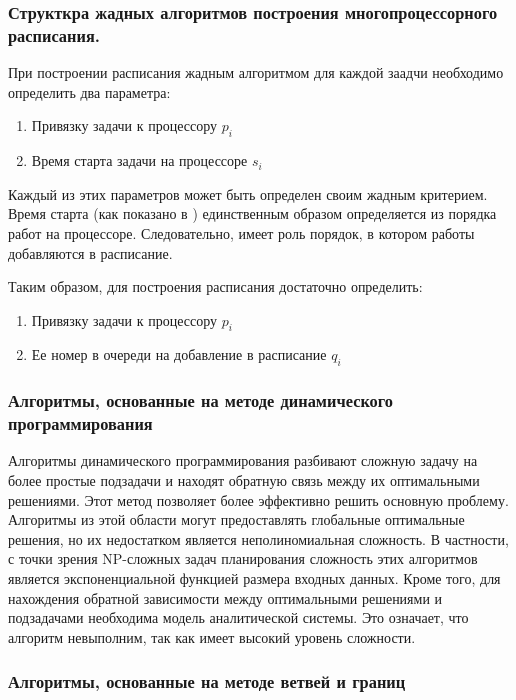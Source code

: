 \subsubsection{Структкра жадных алгоритмов построения многопроцессорного расписания.}
При построении расписания жадным алгоритмом для каждой заадчи необходимо определить два параметра:
\begin{enumerate}
    \item Привязку задачи к процессору $p_i$
    \item Время старта задачи на процессоре $s_i$
\end{enumerate}
Каждый из этих параметров может быть определен своим жадным критерием. Время старта (как показано в \cite{Kalashnikov_2004}) единственным образом определяется из порядка работ на процессоре. Следовательно, имеет роль порядок, в котором работы добавляются в расписание.

Таким образом, для построения расписания достаточно определить:
\begin{enumerate}
    \item Привязку задачи к процессору $p_i$
    \item Ее номер в очереди на добавление в расписание $q_i$
\end{enumerate}

\subsubsection{Алгоритмы, основанные на методе динамического программирования}

Алгоритмы динамического программирования разбивают сложную задачу на более простые подзадачи и находят обратную связь между их оптимальными решениями. Этот метод позволяет более эффективно решить основную проблему. Алгоритмы из этой области могут предоставлять глобальные оптимальные решения, но их недостатком является неполиномиальная сложность. В частности, с точки зрения NP-сложных задач планирования сложность этих алгоритмов является экспоненциальной функцией размера входных данных. Кроме того, для нахождения обратной зависимости между оптимальными решениями и подзадачами необходима модель аналитической системы. Это означает, что алгоритм невыполним, так как имеет высокий уровень сложности.

\subsubsection{Алгоритмы, основанные на методе ветвей и границ}

